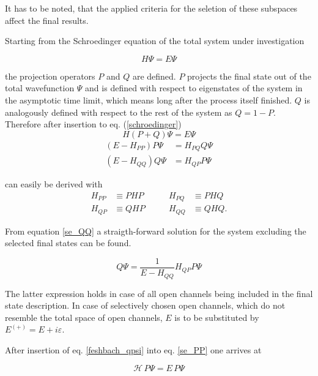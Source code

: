 It has to be noted, that the applied criteria for the seletion of
these subspaces affect the final results.

Starting from the Schroedinger equation of the total system under investigation

\begin{equation}
  H \Psi = E \Psi \label{schroedinger}
\end{equation}

the projection operators $P$ and $Q$ are defined. $P$ projects the final state out
of the total wavefunction $\Psi$ and is defined with respect to eigenstates
of the system in the asymptotic time limit, which means long after the process
itself finished. $Q$ is analogously defined with respect to the rest of the
system as $Q = 1 - P$. Therefore after insertion to eq. (\ref{schroedinger})
\begin{equation}
  H (P+Q) \Psi = E \Psi
\end{equation}
\begin{align}
  (E - H_{PP}) P \Psi & = H_{PQ} Q \Psi \label{se_PP}\\
  (E - H_{QQ}) Q \Psi & = H_{QP} P \Psi \label{se_QQ}
\end{align}

can easily be derived with
\begin{align*}
  H_{PP} & \equiv PHP & \quad\quad H_{PQ} & \equiv PHQ\\
  H_{QP} & \equiv QHP & \quad\quad H_{QQ} & \equiv QHQ .
\end{align*}

From equation \ref{se_QQ} a straigth-forward solution for the system excluding
the selected final states can be found.

\begin{equation}
  Q \Psi = \frac{1}{E-H_{QQ}} H_{QP} P \Psi \label{feshbach_qpsi}
\end{equation}

The latter expression holds in case of all open channels being included
in the final state description.
In case of selectively chosen open channels, which do not resemble the total
space of open channels,
$E$ is to be substituted by $E^{(+)}=E + i\varepsilon$.

After insertion of eq. \ref{feshbach_qpsi} into eq. \ref{se_PP} one arrives at

\begin{equation}
  \mathscr{H} \,P \Psi = E \,P \Psi \label{se_ppsi}
\end{equation}

